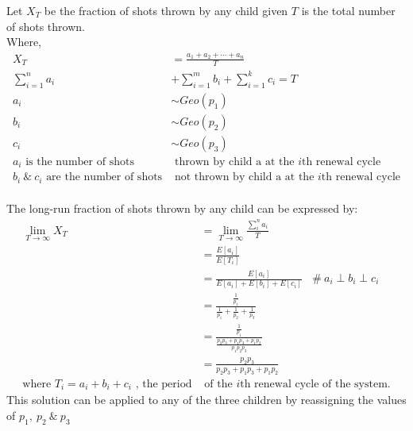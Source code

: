\documentclass[a4paper, fleqn]{article}
\begin{document}
Let $X_T$ be the fraction of shots thrown by any child given $T$ is the total number of shots thrown.\\
Where,
$$\begin{aligned}
X_T&=\frac{a_1+a_2+\cdots+a_n}{T}\\
\sum_{i=1}^n a_i&+\sum_{i=1}^m b_i+\sum_{i=1}^kc_i=T\\
a_i&\sim Geo(p_1)\\
b_i&\sim Geo(p_2)\\
c_i&\sim Geo(p_3)\\
a_i\text{ is the number of shots}&\text{ thrown by child a at the }i\text{th renewal cycle}\\
b_i\ \&\ c_i\text{ are the number of shots}&\text{ not thrown by child a at the }i\text{th renewal cycle}
\end{aligned}$$\\
The long-run fraction of shots thrown by any child can be expressed by:
$$
\begin{aligned}
\lim_{T\rightarrow\infty}X_T&=\lim_{T\rightarrow\infty}\frac{\sum_i^n a_i}{T}\\
&=\frac{E[a_i]}{E[T_i]}\\
&=\frac{E[a_i]}{E[a_i]+E[b_i]+E[c_i]}\ \ \ \ \#\ a_i\perp b_i\perp c_i\\
&=\frac{\frac{1}{p_1}}{\frac{1}{p_1}+\frac{1}{p_2}+\frac{1}{p_3}}\\
&=\frac{\frac{1}{p_1}}{\frac{p_2p_3+p_1p_3+p_1p_2}{p_1p_2p_3}}\\
&=\frac{p_2p_3}{p_2p_3+p_1p_3+p_1p_2}\\
\text{where }T_i=a_i+b_i+c_i\text{ , the period}&\text{ of the }i\text{th renewal cycle of the system.}
\end{aligned}
$$
This solution can be applied to any of the three children by reassigning the values of $p_1,\ p_2\ \&\ p_3$
\pagebreak
\end{document}

